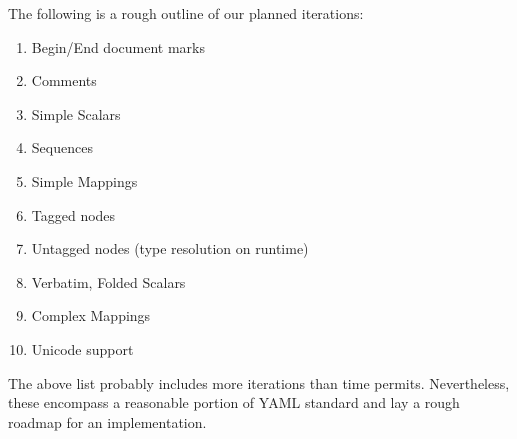 \documentclass{article}
\begin{document}
The following is a rough outline of our planned iterations:

\begin{enumerate}
  \item Begin/End document marks
  \item Comments
  \item Simple Scalars
  \item Sequences
  \item Simple Mappings
  \item Tagged nodes
  \item Untagged nodes (type resolution on runtime)
  \item Verbatim, Folded Scalars
  \item Complex Mappings
  \item Unicode support
\end{enumerate}

The above list probably includes more iterations than time permits.  Nevertheless, these encompass a reasonable portion of YAML standard and lay a rough roadmap for an implementation.
\end{document}
